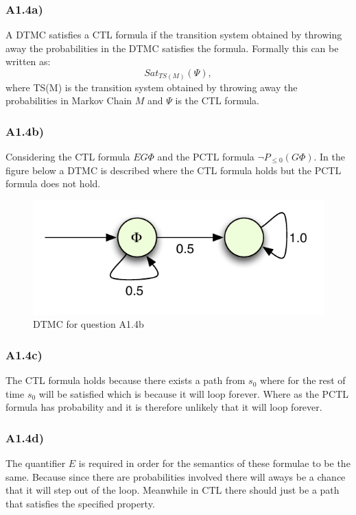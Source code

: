 \documentclass[12pt]{report}
\begin{document}
\subsubsection*{A1.4a)}
A DTMC satisfies a CTL formula if the transition system obtained by throwing away the probabilities in the DTMC satisfies the formula. Formally this can be written as:
$$Sat_{TS(M)}(\Psi),$$
where TS(M) is the transition system obtained by throwing away the probabilities in Markov Chain $M$ and $\Psi$ is the CTL formula.

\subsubsection*{A1.4b)}
Considering the CTL formula $EG \Phi$ and the PCTL formula $\neg P_{\leq 0}(G \Phi)$. In the figure below a DTMC is described where the CTL formula holds but the PCTL formula does not hold.
\begin{figure}[H]
	\begin{center}
		\includegraphics[scale=.85]{../GFX/Answer-A1-4b.pdf}
	\end{center}
	\caption{DTMC for question A1.4b}
	\label{fig:1a14b}
\end{figure}

\subsubsection*{A1.4c)}
The CTL formula holds because there exists a path from $s_0$ where for the rest of time $s_0$ will be satisfied which is because it will loop forever. Where as the PCTL formula has probability and it is therefore unlikely that it will loop forever.

\subsubsection*{A1.4d)}
The quantifier $E$ is required in order for the semantics of these formulae to be the same. Because since there are probabilities involved there will aways be a chance that it will step out of the loop. Meanwhile in CTL there should just be a path that satisfies the specified property.
\end{document}
